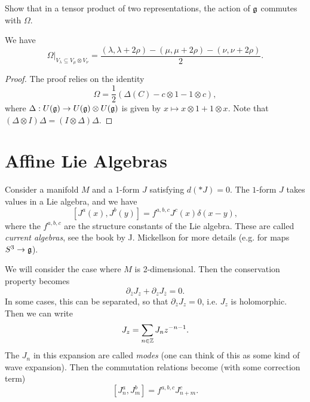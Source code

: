 \begin{exercise}
  Show that in a tensor product of
  two representations, the action of $\mathfrak{g}$
  commutes with $\Omega$.
\end{exercise}

\begin{prop}
  We have
  \[
    \Omega|_{V_\lambda \subseteq V_\mu \otimes V_\nu}
    = \frac{(\lambda, \lambda + 2\rho) - (\mu, \mu + 2\rho) - (\nu, \nu + 2\rho)}{2}.
  \]
\end{prop}

\begin{proof}
  The proof relies on the identity
  \[
    \Omega = \frac{1}{2}(\Delta(C) - c \otimes 1 - 1 \otimes c),
  \]
  where $\Delta : U(\mathfrak{g}) \to U(\mathfrak{g}) \otimes U(\mathfrak{g})$
  is given by $x \mapsto x \otimes 1 + 1 \otimes x$. Note that
  $(\Delta \otimes I) \Delta = (I \otimes \Delta) \Delta$.
\end{proof}

\section{Affine Lie Algebras}

\begin{remark}
  Consider a manifold $M$ and a 1-form
  $J$ satisfying $d(* J) = 0$. The
  $1$-form $J$ takes values in a Lie
  algebra, and we have
  \[
    [J^a(x), J^b(y)]
    = f^{a, b, c} J^c(x) \delta(x - y),
  \]
  where the $f^{a, b, c}$ are the
  structure constants of the Lie algebra.
  These are called \emph{current algebras},
  see the book by J. Mickellson for
  more details (e.g. for maps $S^3 \to \mathfrak{g}$).

  We will consider the case where
  $M$ is 2-dimensional. Then the
  conservation property becomes
  \[
    \partial_{\overline{z}} J_z
    + \partial_z J_{\overline{z}} = 0.
  \]
  In some cases, this can be separated,
  so that $\partial_{\overline{z}} J_z = 0$,
  i.e. $J_z$ is holomorphic. Then we can write
  \[
    J_z = \sum_{n \in \mathbb{Z}} J_n z^{-n - 1}.
  \]
  The $J_n$ in this expansion are called
  \emph{modes} (one can think of this as
  some kind of wave expansion). Then
  the commutation relations become
  (with some correction term)
  \[
    [J^a_n, J^b_m]
    = f^{a, b, c} J^c_{n + m}.
  \]
\end{remark}

